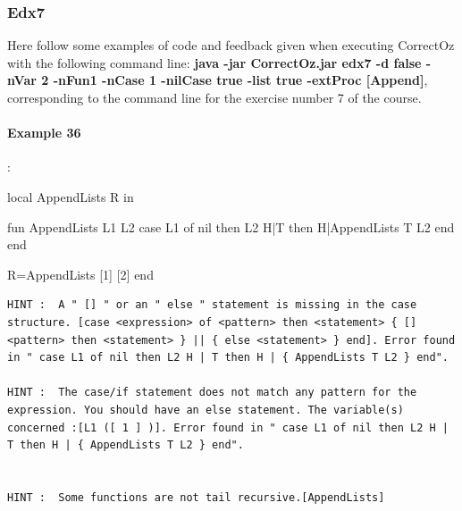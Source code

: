 \documentclass[11pt,a4paper,twoside,openright]{report}
\begin{document}
%
%
%
%



\subsubsection{Edx7}
Here follow some examples of code and feedback given when executing 
CorrectOz with the following command line: \textbf{java -jar CorrectOz.jar edx7 -d 
false -nVar 2 -nFun1 -nCase 1 -nilCase true -list true -extProc [Append]}, 
corresponding to the command line for the exercise number 7 of the course.

\paragraph{Example 36}:

\begin{OZ}
local AppendLists R in

	fun {AppendLists L1 L2}
		case L1 of nil then L2
		 H|T then H|{AppendLists T L2}
		end
	end

R={AppendLists [1] [2]}
end
\end{OZ}

\begin{lstlisting}
HINT :  A " [] " or an " else " statement is missing in the case structure. [case <expression> of <pattern> then <statement> { [] <pattern> then <statement> } || { else <statement> } end]. Error found in " case L1 of nil then L2 H | T then H | { AppendLists T L2 } end".

HINT :  The case/if statement does not match any pattern for the expression. You should have an else statement. The variable(s) concerned :[L1 ([ 1 ] )]. Error found in " case L1 of nil then L2 H | T then H | { AppendLists T L2 } end".


HINT :  Some functions are not tail recursive.[AppendLists]

\end{lstlisting}
\end{document}

